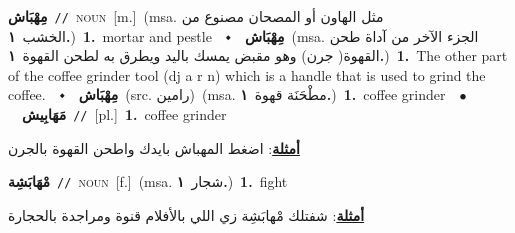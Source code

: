 \documentclass[10pt,a4paper,twoside]{article} %
\begin{document}
\begin{multicols}{2}
{\setlength\topsep{0pt}\textbf{\foreignlanguage{arabic}{مِهْبَاش}}\ {\color{gray}\texttt{//}\color{black}}\ \textsc{noun}\ [m.]\ \color{gray}(msa. \foreignlanguage{arabic}{مثل الهاون أو المصحان مصنوع من الخشب}~\foreignlanguage{arabic}{\textbf{١.}})\color{black}\ \textbf{1.}~mortar and pestle\ \ $\smblkdiamond$\ \ \setlength\topsep{0pt}\textbf{\foreignlanguage{arabic}{مِهْبَاش}}\ \color{gray}(msa. \foreignlanguage{arabic}{الجزء الآخر من آداة طحن القهوة( جرن) وهو مقبض يمسك باليد ويطرق به لطحن القهوة}~\foreignlanguage{arabic}{\textbf{١.}})\color{black}\ \textbf{1.}~The other part of the coffee grinder tool (dj a r n) which is a handle that is used to grind the coffee.\ \ $\smblkdiamond$\ \ \setlength\topsep{0pt}\textbf{\foreignlanguage{arabic}{مِهْبَاش}}\ (src. \color{gray}\foreignlanguage{arabic}{رامين}\color{black})\ \color{gray}(msa. \foreignlanguage{arabic}{مطْحَنَة قهوة}~\foreignlanguage{arabic}{\textbf{١.}})\color{black}\ \textbf{1.}~coffee grinder\ \ $\bullet$\ \ \setlength\topsep{0pt}\textbf{\foreignlanguage{arabic}{مَهَابِيش}}\ {\color{gray}\texttt{//}\color{black}}\ [pl.]\ \textbf{1.}~coffee grinder\  \begin{flushright}\color{gray}\foreignlanguage{arabic}{\textbf{\underline{\foreignlanguage{arabic}{أمثلة}}}: اضغط المهباش بايدك واطحن القهوة بالجرن}\end{flushright}\color{black}} \vspace{2mm}

{\setlength\topsep{0pt}\textbf{\foreignlanguage{arabic}{مْهَابَشِة}}\ {\color{gray}\texttt{//}\color{black}}\ \textsc{noun}\ [f.]\ \color{gray}(msa. \foreignlanguage{arabic}{شجار}~\foreignlanguage{arabic}{\textbf{١.}})\color{black}\ \textbf{1.}~fight\  \begin{flushright}\color{gray}\foreignlanguage{arabic}{\textbf{\underline{\foreignlanguage{arabic}{أمثلة}}}: شفتلك مْهابَشِة زي اللي بالأفلام قنوة ومراجدة بالحجارة}\end{flushright}\color{black}} \vspace{2mm}


\end{multicols}
\end{document}
